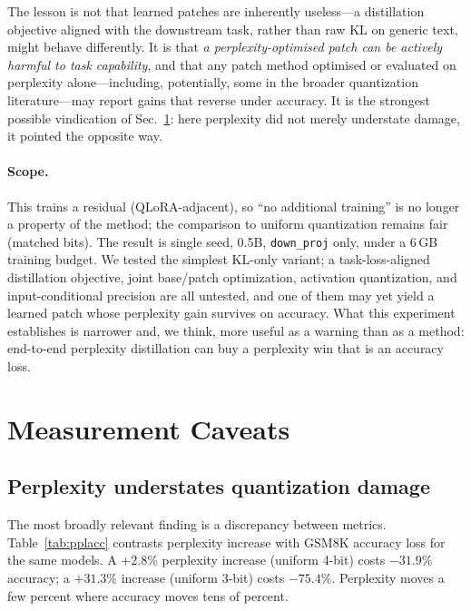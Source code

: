 \documentclass[11pt]{article}
\newcommand{\code}[1]{\texttt{#1}}
\begin{document}
The lesson is not that learned patches are inherently useless---a
distillation objective aligned with the downstream task, rather than raw KL on
generic text, might behave differently. It is that \emph{a perplexity-optimised
patch can be actively harmful to task capability}, and that any patch method
optimised or evaluated on perplexity alone---including, potentially, some in
the broader quantization literature---may report gains that reverse under
accuracy. It is the strongest possible vindication of Sec.~\ref{sec:caveats}:
here perplexity did not merely understate damage, it pointed the opposite way.

\paragraph{Scope.} This trains a residual (QLoRA-adjacent), so ``no additional
training'' is no longer a property of the method; the comparison to uniform
quantization remains fair (matched bits). The result is single seed, 0.5B,
\code{down\_proj} only, under a 6\,GB training budget. We tested the simplest
KL-only variant; a task-loss-aligned distillation objective, joint base/patch
optimization, activation quantization, and input-conditional precision are all
untested, and one of them may yet yield a learned patch whose perplexity gain
survives on accuracy. What this experiment establishes is narrower and, we
think, more useful as a warning than as a method: end-to-end perplexity
distillation can buy a perplexity win that is an accuracy loss.

\section{Measurement Caveats}
\label{sec:caveats}

\subsection{Perplexity understates quantization damage}
The most broadly relevant finding is a discrepancy between metrics.
Table~\ref{tab:pplacc} contrasts perplexity increase with GSM8K accuracy loss
for the same models. A $+2.8\%$ perplexity increase (uniform 4-bit) costs
$-31.9\%$ accuracy; a $+31.3\%$ increase (uniform 3-bit) costs $-75.4\%$.
Perplexity moves a few percent where accuracy moves tens of percent.
\end{document}
